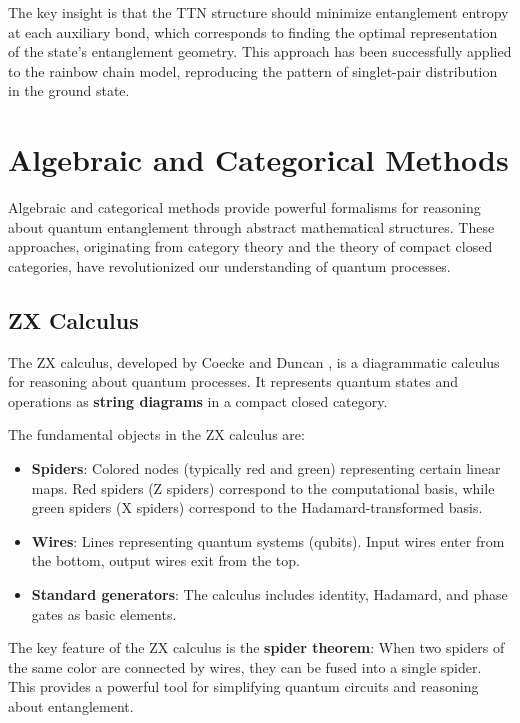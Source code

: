 \documentclass[%
 amsmath,amssymb,
 aps,
rmp,
]{revtex4-2}
\begin{document}
The key insight is that the TTN structure should minimize entanglement entropy at each auxiliary bond, which corresponds to finding the optimal representation of the state's entanglement geometry. This approach has been successfully applied to the rainbow chain model, reproducing the pattern of singlet-pair distribution in the ground state.

\section{Algebraic and Categorical Methods}
\label{sec:algebraic}

Algebraic and categorical methods provide powerful formalisms for reasoning about quantum entanglement through abstract mathematical structures. These approaches, originating from category theory and the theory of compact closed categories, have revolutionized our understanding of quantum processes.

\subsection{ZX Calculus}
\label{sec:zx}

The ZX calculus, developed by Coecke and Duncan \cite{cqm,coecke2008interacting,zx-calculus}, is a diagrammatic calculus for reasoning about quantum processes. It represents quantum states and operations as \textbf{string diagrams} in a compact closed category.

The fundamental objects in the ZX calculus are:
\begin{itemize}
	\item \textbf{Spiders}: Colored nodes (typically red and green) representing certain linear maps. Red spiders (Z spiders) correspond to the computational basis, while green spiders (X spiders) correspond to the Hadamard-transformed basis.
	\item \textbf{Wires}: Lines representing quantum systems (qubits). Input wires enter from the bottom, output wires exit from the top.
	\item \textbf{Standard generators}: The calculus includes identity, Hadamard, and phase gates as basic elements.
\end{itemize}

The key feature of the ZX calculus is the \textbf{spider theorem}: When two spiders of the same color are connected by wires, they can be fused into a single spider. This provides a powerful tool for simplifying quantum circuits and reasoning about entanglement.
\end{document}
